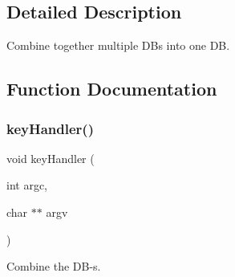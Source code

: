 \subsection{Detailed Description}
Combine together multiple DB\textquotesingle{}s into one DB. 



\subsection{Function Documentation}
\mbox{\label{adat-devel_2main_2dbutil_2dbcombine_8cc_a4bb6e15c68dd2189289ab3095ab1ff5d}} 
\subsubsection{\texorpdfstring{keyHandler()}{keyHandler()}}
{\footnotesize\ttfamily void key\+Handler (\begin{DoxyParamCaption}\item[{int}]{argc,  }\item[{char $\ast$$\ast$}]{argv }\end{DoxyParamCaption})}



Combine the D\+B-\/s. 

